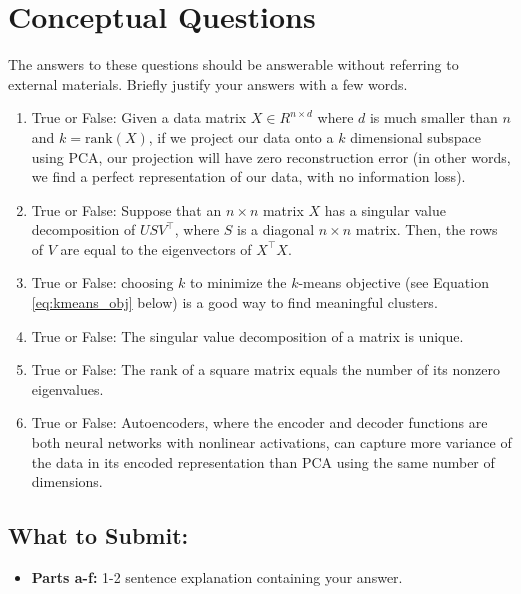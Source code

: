 \documentclass{article}
\begin{document}
\section*{Conceptual Questions}
\begin{aprob}  The answers to these questions should be answerable without referring to external materials. Briefly justify your answers with a few words.
    \begin{enumerate}
      \item {} True or False: Given a data matrix $X \in R^{n \times d}$ where $d$ is much smaller than $n$ and $k = \textrm{rank}(X)$, if we project our data onto a $k$ dimensional subspace using PCA, our projection will have zero reconstruction error (in other words, we find a perfect representation of our data, with no information loss).
      \item {} True or False: Suppose that an $n \times n$ matrix $X$ has a singular value decomposition of $USV^{\top}$, where $S$ is a diagonal $n \times n$ matrix. Then, the rows of $V$ are equal to the eigenvectors of $X^{\top}X$.
      \item {} True or False: choosing $k$ to minimize the $k$-means objective (see Equation \eqref{eq:kmeans_obj} below) is a good way to find meaningful clusters.
    	\item {} True or False: The singular value decomposition of a matrix is unique. 
    	\item {} True or False: The rank of a square matrix equals the number of its nonzero eigenvalues. 
      \item {} True or False: Autoencoders, where the encoder and decoder functions are both neural networks with nonlinear activations, can capture more variance of the data in its encoded representation than  PCA using the same number of dimensions.
    \end{enumerate}

    \subsection*{What to Submit:}
    \begin{itemize}
        \item \textbf{Parts a-f:} 1-2 sentence explanation containing your answer.
    \end{itemize}

\end{aprob}
\pagebreak
\end{document}
